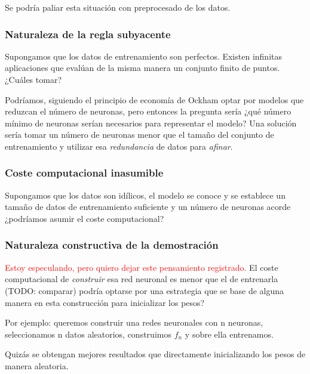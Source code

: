 Se podría paliar esta situación con preprocesado de los datos. 

\subsubsection*{ Naturaleza de la regla subyacente}  

Supongamos que los datos de entrenamiento son perfectos. Existen infinitas aplicaciones 
que evalúan de la misma manera un conjunto finito de puntos. 
¿Cuáles tomar?

Podríamos, siguiendo el principio de economía de Ockham optar
por modelos que reduzcan el número de neuronas, pero entonces la 
pregunta sería  ¿qué número mínimo de neuronas serían necesarios para representar el modelo? 
Una solución sería tomar un número de neuronas menor que el tamaño del conjunto de 
entrenamiento y utilizar esa \textit{redundancia} de datos para 
\textit{afinar}. 

\subsubsection*{Coste computacional inasumible}  
Supongamos que los datos son idílicos, el modelo se conoce y se establece un tamaño de datos de entrenamiento suficiente y
un número de neuronas acorde  ¿podríamos asumir el coste computacional?

\subsubsection*{Naturaleza constructiva de la demostración}
\textcolor{red}{Estoy especulando, pero quiero dejar este pensamiento registrado.}
El coste computacional de \textit{construir} esa red neuronal 
es menor que el de entrenarla (TODO: comparar)
podría optarse por una estrategia que se base de alguna manera 
en esta construcción para inicializar los pesos?

Por ejemplo: queremos construir una redes neuronales con n neuronas, 
seleccionamos n datos aleatorios, construimos $f_n$ 
y sobre ella entrenamos. 

Quizás se obtengan mejores resultados que directamente inicializando los pesos de manera aleatoria. 
